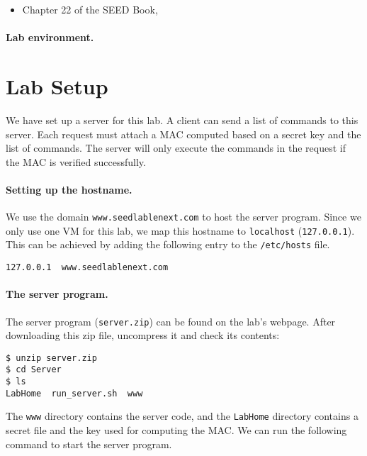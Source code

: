 \begin{itemize}
\item Chapter 22 of the SEED Book, \seedbook
\end{itemize}


\paragraph{Lab environment.} \seedenvironment



\section{Lab Setup}

We have set up a server for this lab. 
A client can send a list of commands to this server. 
Each request must attach a MAC computed based on a secret
key and the list of commands. The server will 
only execute the commands in the request if 
the MAC is verified successfully. 

\paragraph{Setting up the hostname.}
We use the domain \texttt{www.seedlablenext.com} to host the server program. 
Since we only use one VM for this lab, we map this hostname to 
\texttt{localhost} (\texttt{127.0.0.1}). This can be
achieved by adding the following entry to the 
\texttt{/etc/hosts} file.

\begin{lstlisting}
127.0.0.1  www.seedlablenext.com
\end{lstlisting}


\paragraph{The server program.} The server program (\texttt{server.zip})
can be found on the lab's webpage. After downloading this zip file,
uncompress it and check its contents:

\begin{lstlisting}
$ unzip server.zip
$ cd Server
$ ls 
LabHome  run_server.sh  www
\end{lstlisting}

The \texttt{www} directory contains the server code, and the 
\texttt{LabHome} directory contains a secret file and 
the key used for computing the MAC. We 
can run the following command to start the server program.

